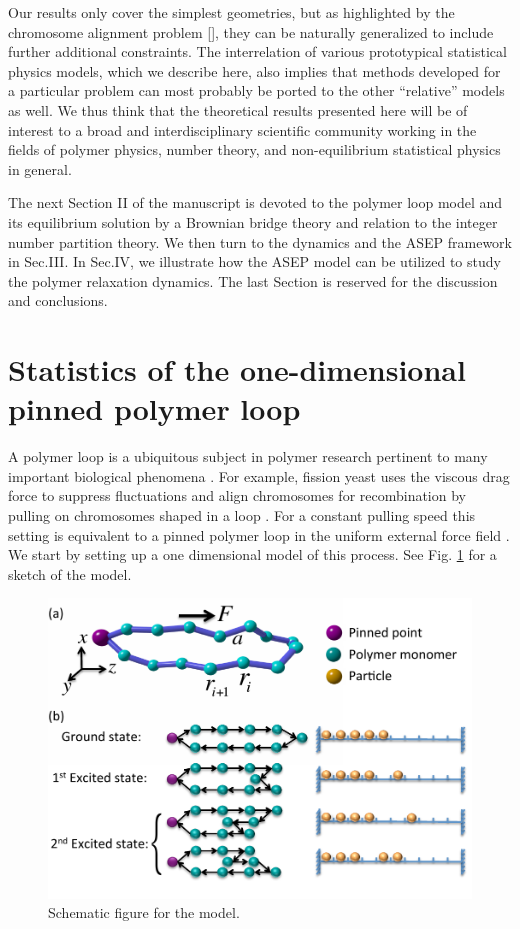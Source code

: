 \documentclass[aps,showpacs,twocolumn,floatfix,prx,superscriptaddress]{revtex4-1}
\begin{document}
Our results only cover the simplest geometries, but as highlighted by the chromosome alignment problem [], they can be naturally generalized to include further additional constraints. The interrelation of various prototypical statistical physics models, which we describe here, also implies that methods developed for a particular problem can most probably be ported to the other ``relative'' models as well. We thus think that the theoretical results presented here will be of interest to a broad and interdisciplinary scientific community working in the fields of polymer physics, number theory, and non-equilibrium statistical physics in general. 

The next Section II of the manuscript is devoted to the polymer loop model and its equilibrium solution by a Brownian bridge theory and relation to the integer number partition theory. We then turn to the dynamics and the ASEP framework in Sec.III. In Sec.IV, we illustrate how the ASEP model can be utilized to study the polymer relaxation dynamics. The last Section is reserved for the discussion and conclusions.

\section{Statistics of the one-dimensional pinned polymer loop}
A polymer loop is a ubiquitous subject in polymer research pertinent to many
important biological phenomena \cite{}. For example, fission yeast uses the
viscous drag force to suppress fluctuations and align chromosomes for
recombination by pulling on chromosomes shaped in a loop \cite{}. For a constant
pulling speed this setting is equivalent to a pinned polymer loop in the uniform
external force field \cite{}. We start by setting up a one dimensional model of
this process. See Fig. \ref{fig:schematic} for a sketch of the model.
\begin{figure}[htpb]
    \centering
    \includegraphics[width=1.0\linewidth]{schematic}
    \caption{Schematic figure for the model.}
    \label{fig:schematic}
\end{figure}
\end{document}
